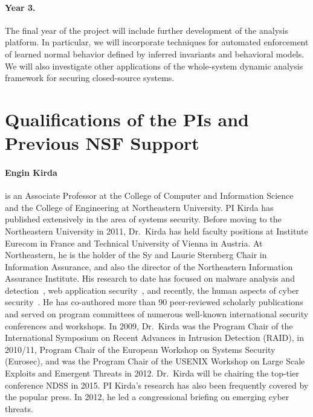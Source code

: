 \documentclass[letterpaper,twoside,11pt,headings=small]{scrartcl}
\begin{document}
\paragraph{Year 3.} The final year of the project will include further
development of the analysis platform.  In particular, we will incorporate
techniques for automated enforcement of learned normal behavior defined by
inferred invariants and behavioral models.  We will also investigate other
applications of the whole-system dynamic analysis framework for securing
closed-source systems.

\section{Qualifications of the PIs and Previous NSF Support}
\label{sec:qualifications}

\paragraph{Engin Kirda} is an Associate Professor at the College of Computer
and Information Science and the College of Engineering at Northeastern
University. PI Kirda has published extensively in the area of systems
security. Before moving to the Northeastern University in 2011, Dr.~Kirda has
held faculty positions at Institute Eurecom in France and Technical University
of Vienna in Austria. At Northeastern, he is the holder of the Sy and Laurie
Sternberg Chair in Information Assurance, and also the director of the
Northeastern Information Assurance Institute. His research to date has focused
on malware analysis and detection~\cite{bayer:ndss2009:malware,kirda06:bho,kolbitsch10:gadget,moser:ssp2007:malware,yin07:panorama},
web application security~\cite{kirda10,mcallister2008}, and recently,
the human aspects of cyber security~\cite{onarlioglu12,irani11,balduzzi10:raid,bilge09:social,wondracek10:deanon}.
He has co-authored more than 90 peer-reviewed scholarly publications and served on
program committees of numerous well-known international security conferences
and workshops. In 2009, Dr.~Kirda was the Program Chair of the International
Symposium on Recent Advances in Intrusion Detection (RAID), in 2010/11,
Program Chair of the European Workshop on Systems Security (Eurosec), and was
the Program Chair of the USENIX Workshop on Large Scale Exploits and Emergent
Threats in 2012. Dr.~Kirda will be chairing the top-tier conference NDSS in
2015. PI Kirda's research has also been frequently covered by the popular
press. In 2012, he led a congressional briefing on emerging cyber threats.
\end{document}
